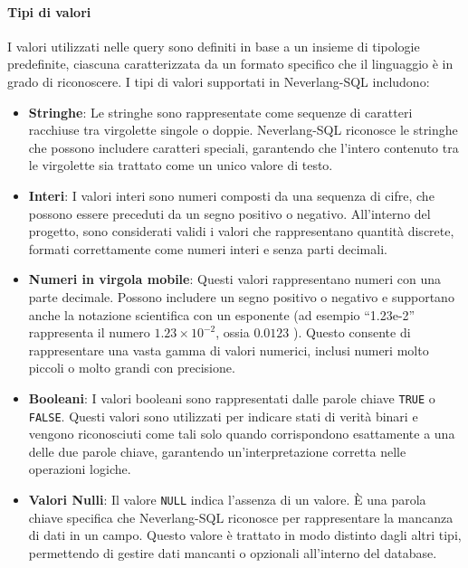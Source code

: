 \documentclass[12pt,a4paper,openright,twoside]{book}
\begin{document}
\paragraph{Tipi di valori}
I valori utilizzati nelle query sono definiti in base a un insieme di tipologie predefinite, ciascuna caratterizzata da un formato 
specifico che il linguaggio è in grado di riconoscere. I tipi di valori supportati in Neverlang-SQL includono:
\begin{itemize}
    \item \textbf{Stringhe}: Le stringhe sono rappresentate come sequenze di caratteri racchiuse tra virgolette singole o doppie. 
    Neverlang-SQL riconosce le stringhe che possono includere caratteri speciali, garantendo che l’intero contenuto tra le virgolette 
    sia trattato come un unico valore di testo.
	\item \textbf{Interi}: I valori interi sono numeri composti da una sequenza di cifre, che possono essere preceduti da un segno 
    positivo o negativo. All'interno del progetto, sono considerati validi i valori che rappresentano quantità discrete, formati 
    correttamente come numeri interi e senza parti decimali.
	\item \textbf{Numeri in virgola mobile}: Questi valori rappresentano numeri con una parte decimale. Possono includere un segno 
    positivo o negativo e supportano anche la notazione scientifica con un esponente (ad esempio ``1.23e-2'' rappresenta il numero 
    $1.23 \times 10^{-2}$, ossia $0.0123$ ). Questo consente di rappresentare una vasta gamma di valori numerici, inclusi numeri 
    molto piccoli o molto grandi con precisione.
	\item \textbf{Booleani}: I valori booleani sono rappresentati dalle parole chiave \texttt{TRUE} o \texttt{FALSE}. Questi valori 
    sono utilizzati per indicare stati di verità binari e vengono riconosciuti come tali solo quando corrispondono esattamente a 
    una delle due parole chiave, garantendo un’interpretazione corretta nelle operazioni logiche.
	\item \textbf{Valori Nulli}: Il valore \texttt{NULL} indica l’assenza di un valore. È una parola chiave specifica che 
    Neverlang-SQL riconosce per rappresentare la mancanza di dati in un campo. Questo valore è trattato in modo distinto dagli 
    altri tipi, permettendo di gestire dati mancanti o opzionali all’interno del database.
\end{itemize}
\end{document}
